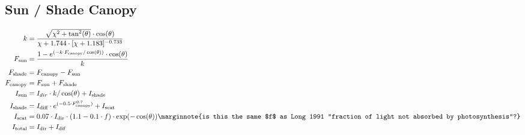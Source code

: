 \documentclass[24pt]{report}
\begin{document}
\subsection*{Sun / Shade Canopy}
\begin{align}
 k &= \frac{\sqrt{\chi^2 + \tan^2(\theta)} \cdot \cos(\theta)}{\chi + 1.744 \cdot[\chi + 1.183]^{-0.733}} \label{eqn:k} \\
 F_{\text{sun}} &= \frac{1 - e^{(-k\cdot F_{\text{canopy}}/\cos(\theta))}\cdot \cos(\theta)}{k} \label{eqn:Fsun} \\
 F_{\text{shade}} &= F_{\text{canopy}} - F_{\text{sun}} \label{eqn:Fshade} \\
 F_{\text{canopy}} &= F_{\text{sun}} + F_{\text{shade}} \label{eqn:Fcanopy} \\
 I_{\text{sun}} &= I_{dir} \cdot k / \cos(\theta) + I_{\text{shade}} \label{eqn:Isun} \\
 I_{\text{shade}} &= I_{\text{diff}} \cdot e^{(-0.5 \cdot F_{\text{canopy}}^{0.7})} + I_{\text{scat}} \label{eqn:Ishade} \\
 I_{\text{scat}} &= 0.07 \cdot I_{\text{dir}} \cdot (1.1 - 0.1 \cdot f)\cdot \exp(-\cos(\theta)) \label{eqn:Iscat} \marginnote{is this the same $f$ as Long 1991 ``fraction of light not absorbed by photosynthesis''?}\\
 I_{\text{total}} &= I_{\text{dir}} + I_{\text{dif}} \label{eqn:Itotal} 
\end{align}
\end{document}
